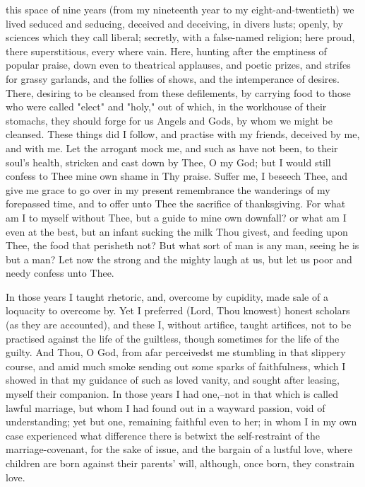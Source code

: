 \documentclass[b5paper,openright,12pt,twoside]{book}
\begin{document}
 this space of nine years (from my nineteenth year to my
eight-and-twentieth) we lived seduced and seducing, deceived and
deceiving, in divers lusts; openly, by sciences which they call liberal;
secretly, with a false-named religion; here proud, there superstitious,
every where vain. Here, hunting after the emptiness of popular praise,
down even to theatrical applauses, and poetic prizes, and strifes for
grassy garlands, and the follies of shows, and the intemperance of
desires. There, desiring to be cleansed from these defilements, by
carrying food to those who were called "elect" and "holy," out of which,
in the workhouse of their stomachs, they should forge for us Angels
and Gods, by whom we might be cleansed. These things did I follow, and
practise with my friends, deceived by me, and with me. Let the arrogant
mock me, and such as have not been, to their soul's health, stricken and
cast down by Thee, O my God; but I would still confess to Thee mine own
shame in Thy praise. Suffer me, I beseech Thee, and give me grace to go
over in my present remembrance the wanderings of my forepassed time,
and to offer unto Thee the sacrifice of thanksgiving. For what am I to
myself without Thee, but a guide to mine own downfall? or what am I even
at the best, but an infant sucking the milk Thou givest, and feeding
upon Thee, the food that perisheth not? But what sort of man is any man,
seeing he is but a man? Let now the strong and the mighty laugh at us,
but let us poor and needy confess unto Thee.

In those years I taught rhetoric, and, overcome by cupidity, made sale
of a loquacity to overcome by. Yet I preferred (Lord, Thou knowest)
honest scholars (as they are accounted), and these I, without artifice,
taught artifices, not to be practised against the life of the guiltless,
though sometimes for the life of the guilty. And Thou, O God, from afar
perceivedst me stumbling in that slippery course, and amid much smoke
sending out some sparks of faithfulness, which I showed in that my
guidance of such as loved vanity, and sought after leasing, myself their
companion. In those years I had one,--not in that which is called
lawful marriage, but whom I had found out in a wayward passion, void of
understanding; yet but one, remaining faithful even to her; in whom I
in my own case experienced what difference there is betwixt the
self-restraint of the marriage-covenant, for the sake of issue, and
the bargain of a lustful love, where children are born against their
parents' will, although, once born, they constrain love.
\end{document}
